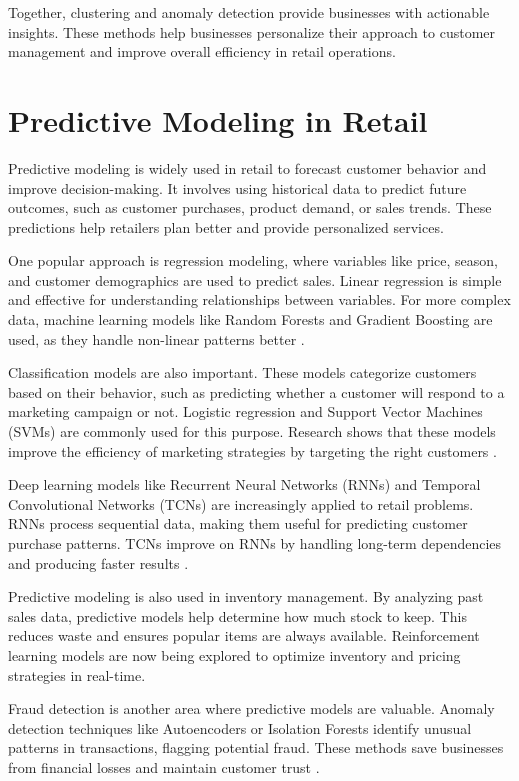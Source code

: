 \documentclass[12pt, a4paper,twoside]{report}
\theoremstyle{plain} %
\theoremstyle{definition} %
\theoremstyle{remark} %
\numberwithin{equation}{chapter}
\begin{document}
Together, clustering and anomaly detection provide businesses with actionable insights. These methods help businesses personalize their approach to customer management and improve overall efficiency in retail operations.


\section{Predictive Modeling in Retail}

Predictive modeling is widely used in retail to forecast customer behavior and improve decision-making. It involves using historical data to predict future outcomes, such as customer purchases, product demand, or sales trends. These predictions help retailers plan better and provide personalized services.

One popular approach is regression modeling, where variables like price, season, and customer demographics are used to predict sales. Linear regression is simple and effective for understanding relationships between variables. For more complex data, machine learning models like Random Forests and Gradient Boosting are used, as they handle non-linear patterns better \cite{breiman2001random}.

Classification models are also important. These models categorize customers based on their behavior, such as predicting whether a customer will respond to a marketing campaign or not. Logistic regression and Support Vector Machines (SVMs) are commonly used for this purpose. Research shows that these models improve the efficiency of marketing strategies by targeting the right customers \cite{vapnik1995svm}.

Deep learning models like Recurrent Neural Networks (RNNs) and Temporal Convolutional Networks (TCNs) are increasingly applied to retail problems. RNNs process sequential data, making them useful for predicting customer purchase patterns. TCNs improve on RNNs by handling long-term dependencies and producing faster results \cite{oord2016wavenet}.

Predictive modeling is also used in inventory management. By analyzing past sales data, predictive models help determine how much stock to keep. This reduces waste and ensures popular items are always available. Reinforcement learning models are now being explored to optimize inventory and pricing strategies in real-time.

Fraud detection is another area where predictive models are valuable. Anomaly detection techniques like Autoencoders or Isolation Forests identify unusual patterns in transactions, flagging potential fraud. These methods save businesses from financial losses and maintain customer trust \cite{hodge2004survey}.
\end{document}
